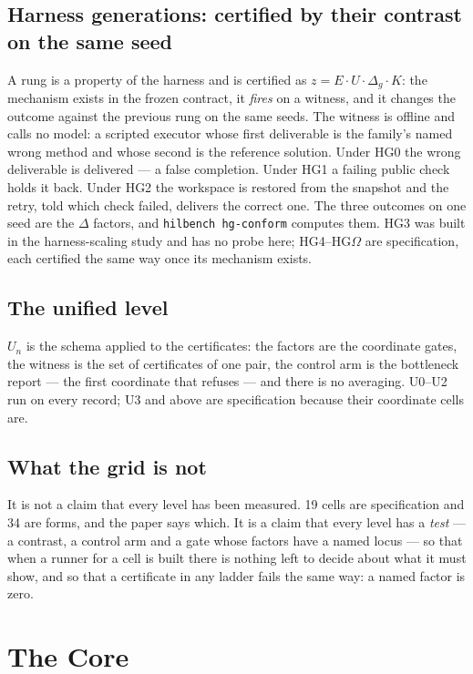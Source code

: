 \subsection{Harness generations: certified by their contrast on the same seed}\label{sec:hgcells}
A rung is a property of the harness and is certified as $z = E \cdot U \cdot \Delta_g \cdot K$: the mechanism exists in the frozen contract, it \emph{fires} on a witness, and it changes the outcome against the previous rung on the same seeds. The witness is offline and calls no model: a scripted executor whose first deliverable is the family's named wrong method and whose second is the reference solution. Under HG0 the wrong deliverable is delivered --- a false completion. Under HG1 a failing public check holds it back. Under HG2 the workspace is restored from the snapshot and the retry, told which check failed, delivers the correct one. The three outcomes on one seed are the $\Delta$ factors, and \texttt{hilbench hg-conform} computes them. HG3 was built in the harness-scaling study and has no probe here; HG4--HG$\Omega$ are specification, each certified the same way once its mechanism exists.

\subsection{The unified level}
$U_n$ is the schema applied to the certificates: the factors are the coordinate gates, the witness is the set of certificates of one pair, the control arm is the bottleneck report --- the first coordinate that refuses --- and there is no averaging. U0--U2 run on every record; U3 and above are specification because their coordinate cells are.

\subsection{What the grid is not}
It is not a claim that every level has been measured. 19 cells are specification and 34 are forms, and the paper says which. It is a claim that every level has a \emph{test} --- a contrast, a control arm and a gate whose factors have a named locus --- so that when a runner for a cell is built there is nothing left to decide about what it must show, and so that a certificate in any ladder fails the same way: a named factor is zero.

\section{The Core}\label{sec:core}

